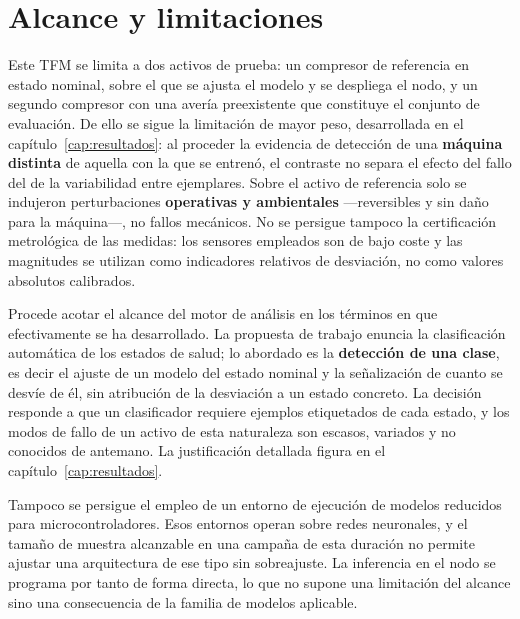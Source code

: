 \section{Alcance y limitaciones}

Este TFM se limita a dos activos de prueba: un compresor de referencia en estado nominal, sobre
el que se ajusta el modelo y se despliega el nodo, y un segundo compresor con una avería
preexistente que constituye el conjunto de evaluación. De ello se sigue la limitación de mayor
peso, desarrollada en el capítulo~\ref{cap:resultados}: al proceder la evidencia de detección de
una \textbf{máquina distinta} de aquella con la que se entrenó, el contraste no separa el efecto
del fallo del de la variabilidad entre ejemplares. Sobre el activo de referencia solo se
indujeron perturbaciones \textbf{operativas y ambientales} —reversibles y sin daño para la
máquina—, no fallos mecánicos. No se persigue tampoco la certificación metrológica de las
medidas: los sensores empleados son de bajo coste y las magnitudes se utilizan como indicadores
relativos de desviación, no como valores absolutos calibrados.

Procede acotar el alcance del motor de análisis en los términos en que efectivamente se ha
desarrollado. La propuesta de trabajo enuncia la clasificación automática de los estados de
salud; lo abordado es la \textbf{detección de una clase}, es decir el ajuste de un modelo del
estado nominal y la señalización de cuanto se desvíe de él, sin atribución de la desviación a un
estado concreto. La decisión responde a que un clasificador requiere ejemplos etiquetados de
cada estado, y los modos de fallo de un activo de esta naturaleza son escasos, variados y no
conocidos de antemano. La justificación detallada figura en el capítulo~\ref{cap:resultados}.

Tampoco se persigue el empleo de un entorno de ejecución de modelos reducidos para
microcontroladores. Esos entornos operan sobre redes neuronales, y el tamaño de muestra
alcanzable en una campaña de esta duración no permite ajustar una arquitectura de ese tipo sin
sobreajuste. La inferencia en el nodo se programa por tanto de forma directa, lo que no supone
una limitación del alcance sino una consecuencia de la familia de modelos aplicable.
